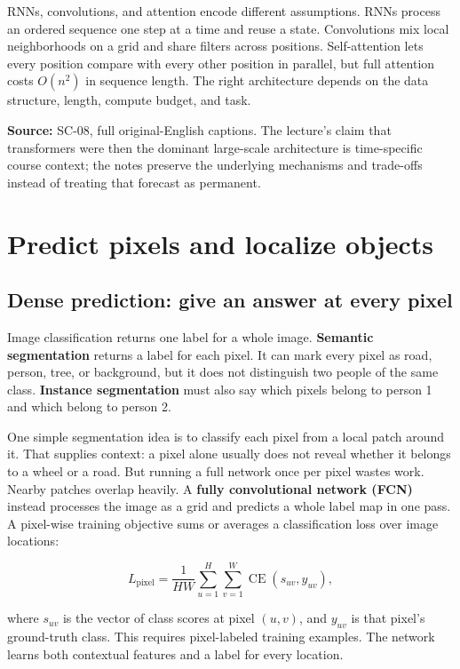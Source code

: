 RNNs, convolutions, and attention encode different assumptions. RNNs process an ordered sequence one step at a time and reuse a state. Convolutions mix local neighborhoods on a grid and share filters across positions. Self-attention lets every position compare with every other position in parallel, but full attention costs \(O(n^2)\) in sequence length. The right architecture depends on the data structure, length, compute budget, and task.

\textbf{Source:} SC-08, full original-English captions. The lecture's claim that transformers were then the dominant large-scale architecture is time-specific course context; the notes preserve the underlying mechanisms and trade-offs instead of treating that forecast as permanent.

\section{Predict pixels and localize objects}\label{04-visual-computing-ii-ch031-predict-pixels-and-localize-objects}

\subsection{Dense prediction: give an answer at every pixel}\label{04-visual-computing-ii-ch031-dense-prediction-give-an-answer-at-every-pixel}

Image classification returns one label for a whole image. \textbf{Semantic segmentation} returns a label for each pixel. It can mark every pixel as road, person, tree, or background, but it does not distinguish two people of the same class. \textbf{Instance segmentation} must also say which pixels belong to person 1 and which belong to person 2.

One simple segmentation idea is to classify each pixel from a local patch around it. That supplies context: a pixel alone usually does not reveal whether it belongs to a wheel or a road. But running a full network once per pixel wastes work. Nearby patches overlap heavily. A \textbf{fully convolutional network (FCN)} instead processes the image as a grid and predicts a whole label map in one pass. A pixel-wise training objective sums or averages a classification loss over image locations:

\[
L_{\text{pixel}}=\frac{1}{HW}\sum_{u=1}^{H}\sum_{v=1}^{W}\operatorname{CE}(s_{uv},y_{uv}),
\]

where \(s_{uv}\) is the vector of class scores at pixel \((u,v)\), and \(y_{uv}\) is that pixel's ground-truth class. This requires pixel-labeled training examples. The network learns both contextual features and a label for every location.

